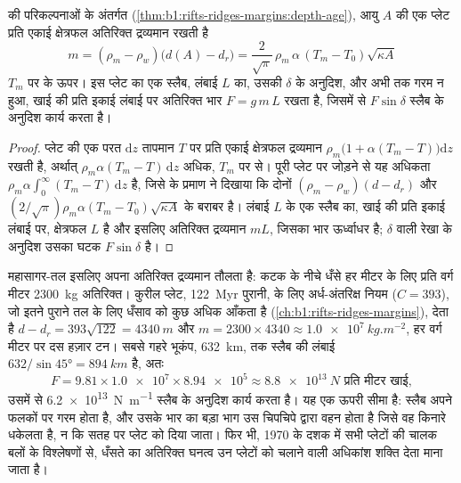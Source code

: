 \begin{proposition}[स्लैब का अतिरिक्त भार]\label{prop:b1:active-margins:slab-weight}
 की परिकल्पनाओं के अंतर्गत (\cref{thm:b1:rifts-ridges-margins:depth-age}), आयु $A$ की एक प्लेट प्रति एकाई क्षेत्रफल अतिरिक्त द्रव्यमान रखती है
\[
  m = (\rho_m - \rho_w)\bigl(d(A) - d_r\bigr)
    = \frac{2}{\sqrt\pi}\,\rho_m\,\alpha\,(T_m - T_0)\sqrt{\kappa A}
\]
$T_m$ पर  के ऊपर। इस प्लेट का एक स्लैब, लंबाई $L$ का, उसकी  $\delta$ के अनुदिश, और अभी तक गरम न हुआ, खाई की प्रति इकाई लंबाई पर अतिरिक्त भार $F = g\,m\,L$ रखता है, जिसमें से $F\sin\delta$ स्लैब के अनुदिश कार्य करता है।
\end{proposition}

\begin{proof}
प्लेट की एक परत $\mathrm dz$ तापमान $T$ पर प्रति एकाई क्षेत्रफल द्रव्यमान $\rho_m\bigl(1 + \alpha(T_m - T)\bigr)\mathrm dz$ रखती है, अर्थात् $\rho_m\alpha(T_m - T)\,\mathrm dz$ अधिक, $T_m$ पर  से। पूरी प्लेट पर जोड़ने से यह अधिकता $\rho_m\alpha\int_0^\infty (T_m - T)\,\mathrm dz$ है, जिसे  के प्रमाण ने दिखाया कि दोनों $(\rho_m - \rho_w)(d - d_r)$ और $(2/\sqrt\pi)\rho_m\alpha(T_m - T_0)
\sqrt{\kappa A}$ के बराबर है। लंबाई $L$ के एक स्लैब का, खाई की प्रति इकाई लंबाई पर, क्षेत्रफल $L$ है और इसलिए अतिरिक्त द्रव्यमान $mL$, जिसका भार ऊर्ध्वाधर है;  $\delta$ वाली रेखा के अनुदिश उसका घटक $F\sin\delta$ है।
\end{proof}

महासागर-तल इसलिए अपना अतिरिक्त द्रव्यमान तौलता है: कटक के नीचे धँसे हर मीटर के लिए प्रति वर्ग मीटर \qty{2300}{kg} अतिरिक्त। कुरील प्लेट, \qty{122}{Myr} पुरानी, के लिए अर्ध-अंतरिक्ष नियम ($C = 393$), जो इतने पुराने तल के लिए धँसाव को कुछ अधिक आँकता है (\cref{ch:b1:rifts-ridges-margins}), देता है $d - d_r = 393\sqrt{122} = \qty{4340}{m}$ और $m = 2300\times4340 \approx \qty{1.0e7}{kg.m^{-2}}$, हर वर्ग मीटर पर दस हज़ार टन।
सबसे गहरे भूकंप, \qty{632}{km}, तक स्लैब की लंबाई $632/\sin\ang{45} = \qty{894}{km}$ है, अतः
\[
  F = 9.81 \times \num{1.0e7} \times \num{8.94e5} \approx \qty{8.8e13}{N}
  \text{ प्रति मीटर खाई},
\]
उसमें से \qty{6.2e13}{N.m^{-1}} स्लैब के अनुदिश कार्य करता है। यह एक ऊपरी सीमा है: स्लैब अपने फलकों पर गरम होता है, और उसके भार का बड़ा भाग उस चिपचिपे  द्वारा वहन होता है जिसे वह किनारे धकेलता है, न कि सतह पर प्लेट को दिया जाता। फिर भी, 1970 के दशक में सभी प्लेटों की चालक बलों के विश्लेषणों से, धँसते  का अतिरिक्त घनत्व उन प्लेटों को चलाने वाली अधिकांश शक्ति देता माना जाता है।

